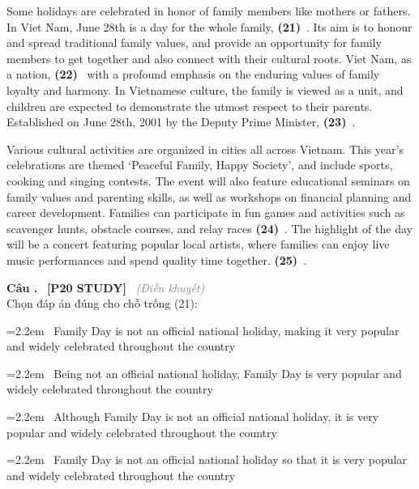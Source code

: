 \documentclass[12pt,a4paper,twoside]{article}
\newcounter{qcounter}
\newcommand{\question}[2][]{%
    \stepcounter{qcounter}%
    \par\vspace{6pt}%
    \noindent\textcolor{primaryBlue}{\textbf{Câu \theqcounter.}}~%
    \textcolor{secondaryBlue}{\small\textbf{[P20 STUDY]}}~%
    \if\relax\detokenize{#1}\relax\else\textcolor{gray}{\small\textit{(#1)}}~\fi\\[1pt]
    \noindent #2%
}
\newcommand{\choiceitem}[2]{%
    \tikz[baseline=-0.5ex]{%
        \node[draw=primaryBlue, circle, minimum size=1.5em, inner sep=0pt, thick] {\textbf{#1}};%
    }~#2%
}
\newenvironment{readingpassage}[1][]{%
    \begin{tcolorbox}[enhanced, colback=grayLight, colframe=secondaryBlue,
        coltitle=textDark, fonttitle=\bfseries, title={#1},
        rounded corners, arc=3mm, boxrule=1pt,
        left=15pt, right=15pt, top=10pt, bottom=10pt,
        breakable, before skip=10pt, after skip=10pt, drop fuzzy shadow]
    \setstretch{1.3}
}{\end{tcolorbox}}
\begin{document}
\begin{readingpassage}[]
Some holidays are celebrated in honor of family members like mothers or fathers. In Viet Nam, June 28th is a day for the whole family, \textbf{(21)}~\underline{\hspace{1.3cm}}. Its aim is to honour and spread traditional family values, and provide an opportunity for family members to get together and also connect with their cultural roots. Viet Nam, as a nation, \textbf{(22)}~\underline{\hspace{1.3cm}} with a profound emphasis on the enduring values of family loyalty and harmony. In Vietnamese culture, the family is viewed as a unit, and children are expected to demonstrate the utmost respect to their parents. Established on June 28th, 2001 by the Deputy Prime Minister, \textbf{(23)}~\underline{\hspace{1.3cm}}.

Various cultural activities are organized in cities all across Vietnam. This year’s celebrations are themed ‘Peaceful Family, Happy Society’, and include sports, cooking and singing contests. The event will also feature educational seminars on family values and parenting skills, as well as workshops on financial planning and career development. Families can participate in fun games and activities such as scavenger hunts, obstacle courses, and relay races \textbf{(24)}~\underline{\hspace{1.3cm}}. The highlight of the day will be a concert featuring popular local artists, where families can enjoy live music performances and spend quality time together. \textbf{(25)}~\underline{\hspace{1.3cm}}.
\end{readingpassage}

\question[Điền khuyết]{Chọn đáp án đúng cho chỗ trống (21):}

\par\vspace{4pt}
\noindent\hangindent=2.2em\choiceitem{A}{Family Day is not an official national holiday, making it very popular and widely celebrated throughout the country}\par\vspace{4pt}
\noindent\hangindent=2.2em\choiceitem{B}{Being not an official national holiday, Family Day is very popular and widely celebrated throughout the country}\par\vspace{4pt}
\noindent\hangindent=2.2em\choiceitem{C}{Although Family Day is not an official national holiday, it is very popular and widely celebrated throughout the country}\par\vspace{4pt}
\noindent\hangindent=2.2em\choiceitem{D}{Family Day is not an official national holiday so that it is very popular and widely celebrated throughout the country}\par\vspace{4pt}
\end{document}
